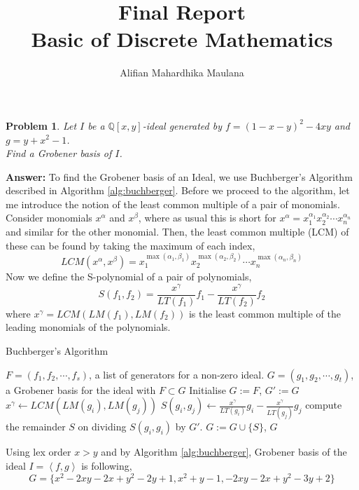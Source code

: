 \documentclass[a4paper,12pt]{article}
\title{Final Report \\ Basic of Discrete Mathematics}
\author{Alifian Mahardhika Maulana}
\newtheorem{prob}{Problem}[]
\theoremstyle{definition}
\newcommand{\Q}{\mathbb{Q}}
\begin{document}
\maketitle
\begin{prob}
	Let $I$ be a $\Q[x,y]$-ideal generated by $f=(1-x-y)^2-4xy$ and $g=y+x^2-1$.\\ Find a Grobener basis of $I$.
\end{prob}
\textbf{Answer:}
To find the Grobener basis of an Ideal, we use Buchberger's Algorithm described in Algorithm \ref{alg:buchberger}. Before we proceed to the algorithm, let me introduce the notion of the least common multiple of a pair of monomials. Consider monomials $x^\alpha$ and $x^\beta$, where as usual this is short for $x^\alpha = x_1^{\alpha_1}x_2^{\alpha_2}\cdots x_n^{\alpha_n}$ and similar for the other monomial. Then, the least common multiple (LCM) of these can be found by taking the maximum of each index,
\begin{equation*}
LCM(x^\alpha,x^\beta) = x_1^{\max(\alpha_1,\beta_1)}x_2^{\max(\alpha_2,\beta_2)}\cdots x_n^{\max(\alpha_n,\beta_n)}
\end{equation*}
Now we define the S-polynomial of a pair of polynomials,
\begin{equation*}
S(f_1,f_2) = \frac{x^\gamma}{LT(f_1)}f_1 - \frac{x^\gamma}{LT(f_2)}f_2
\end{equation*}
where $x^\gamma = LCM(LM(f_1),LM(f_2))$ is the least common multiple of the leading monomials of the polynomials.
\begin{algorithm}[H] %
	\caption{Buchberger's Algorithm} %
	\label{alg:buchberger} %
	\begin{algorithmic} %
		\Require $F = (f_1,f_2,\cdots,f_s)$, a list of generators for a non-zero ideal.
		\Ensure $G = (g_1,g_2,\cdots,g_t)$, a Grobener basis for the ideal with $F\subset G$
		\State Initialise $G:=F$,
		\Repeat
		\State $G':=G$
		\State $x^\gamma \leftarrow LCM(LM(g_i),LM(g_j))$
		\State $S(g_i,g_j) \leftarrow \frac{x^\gamma}{LT(g_i)}g_i - \frac{x^\gamma}{LT(g_j)}g_j$
		\State compute the remainder $S$ on dividing $S(g_i,g_i)$ by $G'$.
		\State $G:=G\cup \{S\}$,
		\EndIf
		\EndFor
		\Return $G$
	\end{algorithmic}
\end{algorithm}
Using lex order $x>y$ and by Algorithm \ref{alg:buchberger}, Grobener basis of the ideal $I=\left< f,g \right>$ is following,
\begin{equation*}
G = \{x^2-2xy-2x+y^2-2y+1, x^2+y-1, -2xy-2x+y^2-3y+2\}
\end{equation*}
\end{document}
